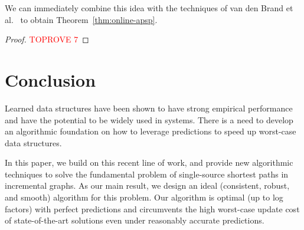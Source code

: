 \documentclass[11pt]{article}
\begin{document}
We can immediately combine this idea with the techniques of van den Brand et al.~\cite[Theorem 3.1]{BrandFNP24} to obtain Theorem~\ref{thm:online-apsp}.  

\begin{proof}\textcolor{red}{TOPROVE 7}\end{proof} \section{Conclusion}

Learned data structures have been shown to have strong empirical performance and have the potential to be widely used in systems.  There is a need to develop an algorithmic foundation on how to leverage predictions to speed up worst-case data structures.  

In this paper, we build on this recent line of work, and provide new algorithmic techniques to solve the fundamental problem of
single-source shortest paths in incremental graphs.  As our main result, we design an ideal (consistent, robust, and smooth) algorithm for this problem.  
Our algorithm is optimal (up to log factors) with perfect predictions and circumvents the high worst-case update cost of state-of-the-art solutions even under reasonably accurate predictions.  


\end{document}
